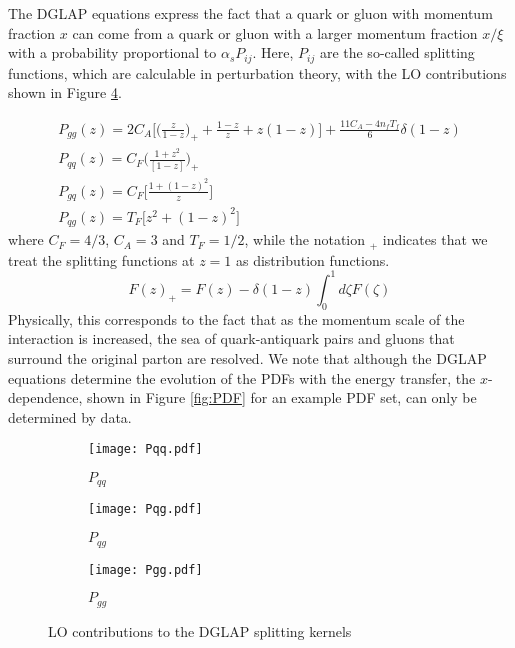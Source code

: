 The DGLAP equations express the fact that a quark or gluon with momentum fraction $x$ can come from a quark or gluon with a larger momentum fraction $x/\xi$ with a probability proportional to $\alpha_s  P_{ij}$. Here, $P_{ij}$ are the so-called splitting functions, which are calculable in perturbation theory, with the LO contributions shown in Figure \ref{fig:DGLAP}.

\begin{equation}\label{eq:splitiing_functions}
    \begin{gathered}
        P_{gg}(z) = 2 C_A\Bigg[\Bigg(\frac{z}{1-z}\Bigg)_+ + \frac{1-z}{z} + z(1-z)\Bigg] + \frac{11C_A - 4n_fT_f}{6}\delta(1-z) \\
        P_{qq}(z) = C_F \Bigg(\frac{1+z^2}{[1-z]}\Bigg)_+ \\
        P_{gq}(z) = C_F\bigg[\frac{1 + (1-z)^2}{z}\bigg] \\
        P_{qg}(z) = T_F\big[z^2 + (1-z)^2\big]         
    \end{gathered}
\end{equation}
where $C_F = 4/3$, $C_A = 3$ and $T_F = 1/2$, while the notation $_+$ indicates that we treat the splitting functions at $z=1$ as distribution functions. 
\begin{equation}
    F(z)_+ = F(z) - \delta(1-z)\int_0^1 d\zeta F(\zeta)
\end{equation}
Physically, this corresponds to the fact that as the momentum scale of the interaction is increased, the sea of quark-antiquark pairs and gluons that surround the original parton are resolved. We note that although the DGLAP equations determine the evolution of the PDFs with the energy transfer, the $x$-dependence, shown in Figure \ref{fig:PDF} for an example PDF set, can only be determined by data.\\
\begin{figure}[H]
    \centering
    \begin{subfigure}{0.32\textwidth}
        \texttt{[image: Pqq.pdf]}
        \caption{$P_{qq}$}
        \label{subfig:Pqq}
    \end{subfigure}
        \begin{subfigure}{0.32\textwidth}
        \texttt{[image: Pqg.pdf]}
        \caption{$P_{qg}$}
        \label{subfig:P_qg}
    \end{subfigure}
        \begin{subfigure}{0.32\textwidth}
        \texttt{[image: Pgg.pdf]}
        \caption{$P_{gg}$}
        \label{subfig:Pgg}
    \end{subfigure}
    \caption{LO contributions to the DGLAP splitting kernels}
    \label{fig:DGLAP}
\end{figure}
